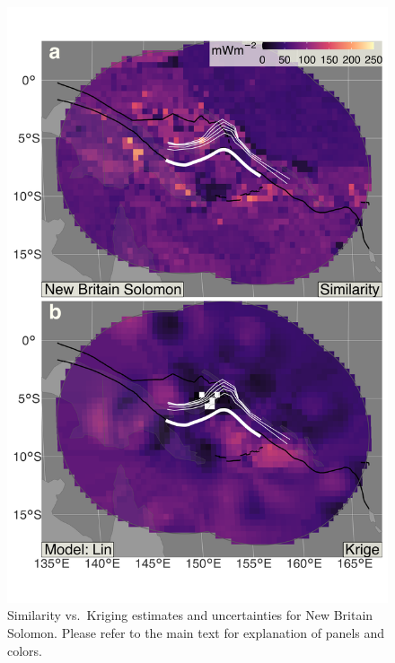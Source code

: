 \begin{figure}
\centering
\includegraphics{assets/figs/chpt3/NewBritainSolomonDiffComp.png}
\caption[Similarity vs.~Kriging estimates and uncertainties for New Britain Solomon]{Similarity vs.~Kriging estimates and uncertainties for New Britain Solomon. Please refer to the main text for explanation of panels and colors.}
\end{figure}

